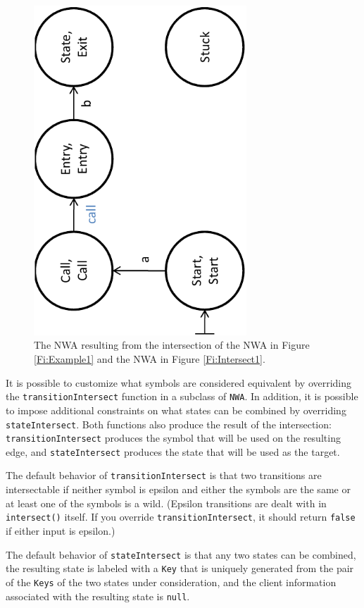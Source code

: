 \begin{figure}[htbp]
  \centering
    \includegraphics[width=8cm]{Figures/Figure6}
  \caption{The NWA resulting from the intersection of the NWA in Figure
    \ref{Fi:Example1} and the NWA in Figure \ref{Fi:Intersect1}.}
  \label{Fi:Intersect2}
\end{figure}

It is possible to customize what symbols are considered equivalent by
overriding the \texttt{transitionIntersect} function in a subclass of
\texttt{NWA}. In addition, it is possible to impose additional constraints on
what states can be combined by overriding \texttt{stateIntersect}. Both
functions also produce the result of the intersection:
\texttt{transitionIntersect} produces the symbol that will be used on the
resulting edge, and \texttt{stateIntersect} produces the state that will be
used as the target.

The default behavior of
\texttt{transitionIntersect} is that two transitions are intersectable if
neither symbol is epsilon and either the symbols are the same or at least one of
the symbols is a wild. (Epsilon transitions are dealt with in
\texttt{intersect()} itself. If you override \texttt{transitionIntersect}, it
should return \texttt{false} if either input is epsilon.)

The default behavior of \texttt{stateIntersect} is that any two
states can be combined, the resulting state is labeled with a
\texttt{Key} that is uniquely generated from the pair of the \texttt{Keys} of
the two states under consideration, and the client information associated
with the resulting state is \texttt{null}.



